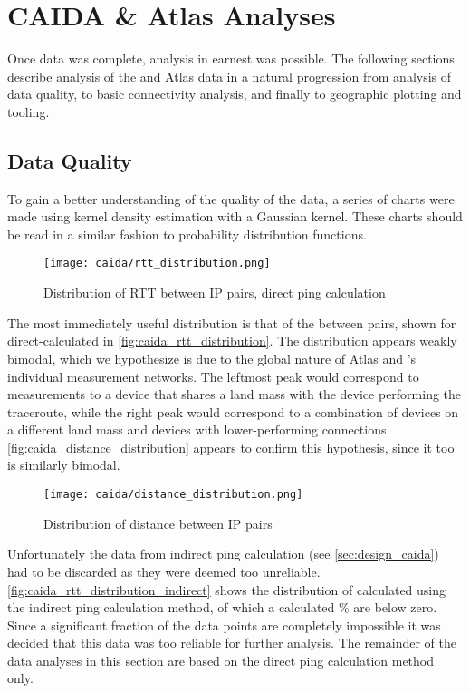 \section{CAIDA \& Atlas Analyses}\label{sec:caida_results}

Once data \etl was complete, analysis in earnest was possible. The following sections describe analysis of the \caida and \ripe Atlas data in a natural progression from analysis of data quality, to basic connectivity analysis, and finally to geographic plotting and \gis tooling.

\subsection{Data Quality}

To gain a better understanding of the quality of the data, a series of charts were made using kernel density estimation with a Gaussian kernel. These charts should be read in a similar fashion to probability distribution functions.

\begin{figure}[H]
    \centering
    \texttt{[image: caida/rtt\_distribution.png]}
    \caption{Distribution of RTT between IP pairs, direct ping calculation}
    \label{fig:caida_rtt_distribution}
\end{figure}

The most immediately useful distribution is that of the \rtt between \ip pairs, shown for direct-calculated \rtts in \autoref{fig:caida_rtt_distribution}. The distribution appears weakly bimodal, which we hypothesize is due to the global nature of \ripe Atlas and \caida's individual measurement networks. The leftmost peak would correspond to measurements to a device that shares a land mass with the device performing the \gls{traceroute}, while the right peak would correspond to a combination of devices on a different land mass and devices with lower-performing connections. \autoref{fig:caida_distance_distribution} appears to confirm this hypothesis, since it too is similarly bimodal.

\begin{figure}[H]
    \centering
    \texttt{[image: caida/distance\_distribution.png]}
    \caption{Distribution of distance between IP pairs}
    \label{fig:caida_distance_distribution}
\end{figure}

Unfortunately the data from indirect ping calculation (see \autoref{sec:design_caida}) had to be discarded as they were deemed too unreliable. \autoref{fig:caida_rtt_distribution_indirect} shows the distribution of \rtts calculated using the indirect ping calculation method, of which a calculated \% are below zero. Since a significant fraction of the data points are completely impossible it was decided that this data was too reliable for further analysis. The remainder of the data analyses in this section are based on the direct ping calculation method only.

